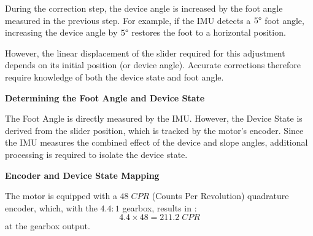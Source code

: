 \documentclass[lettersize,journal]{IEEEtran}
\begin{document}
During the correction step, the device angle is increased by the foot angle measured in the previous step. For example, if the IMU detects a $5\degree$ foot angle, increasing the device angle by $5\degree$ restores the foot to a horizontal position.

However, the linear displacement of the slider required for this adjustment depends on its initial position (or device angle). Accurate corrections therefore require knowledge of both the device state and foot angle.


\medskip
\noindent\textbf{Determining the Foot Angle and Device State}

The Foot Angle is directly measured by the IMU. However, the Device State is derived from the slider position, which is tracked by the motor’s encoder. Since the IMU measures the combined effect of the device and slope angles, additional processing is required to isolate the device state.


\medskip
\noindent\textbf{Encoder and Device State Mapping}%

The motor is equipped with a $48 \;CPR$ (Counts Per Revolution) quadrature encoder, which, with the $4.4:1$ gearbox, results in :
\[
4.4 \times 48 = 211.2 \;CPR
\]
at the gearbox output. 
\end{document}
